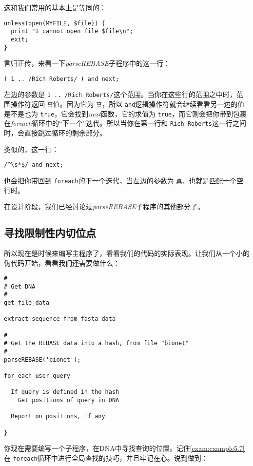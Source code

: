 这和我们常用的基本上是等同的：

\begin{lstlisting}
unless(open(MYFILE, $file)) {
  print "I cannot open file $file\n";
  exit;
}
\end{lstlisting}

言归正传，来看一下\textit{parseREBASE}子程序中的这一行：

\begin{lstlisting}
( 1 .. /Rich Roberts/ ) and next;
\end{lstlisting}

左边的参数是 \verb|1 .. /Rich Roberts/|这个范围。当你在这些行的范围之中时，范围操作符返回 \verb|真|值。因为它为 \verb|真|，所以 \verb|and|逻辑操作符就会继续看看另一边的值是不是也为 \verb|true|，它会找到\textit{next}函数，它的求值为 \verb|true|，而它则会把你带到包裹在\textit{foreach}循环中的“下一个”迭代。所以当你在第一行和 \verb|Rich Roberts|这一行之间时，会直接跳过循环的剩余部分。

类似的，这一行：

\begin{lstlisting}
/^\s*$/ and next;
\end{lstlisting}

也会把你带回到 \verb|foreach|的下一个迭代，当左边的参数为 \verb|真|、也就是匹配一个空行时。


在设计阶段，我们已经讨论过\textit{parseREBASE}子程序的其他部分了。

\subsection{寻找限制性内切位点}
所以现在是时候来编写主程序了，看看我们的代码的实际表现。让我们从一个小的伪代码开始，看看我们还需要做什么：

\begin{lstlisting}
#
# Get DNA
#
get_file_data

extract_sequence_from_fasta_data

#
# Get the REBASE data into a hash, from file "bionet"
#
parseREBASE('bionet');

for each user query

  If query is defined in the hash
    Get positions of query in DNA

  Report on positions, if any

}
\end{lstlisting}

你现在需要编写一个子程序，在DNA中寻找查询的位置。记住\autoref{exam:example5.7}在 \verb|foreach|循环中进行全局查找的技巧，并且牢记在心。说到做到：

